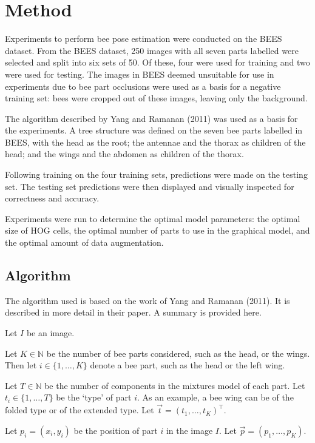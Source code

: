 \documentclass[11pt, oneside]{report}
\begin{document}
\chapter{Method}
    Experiments to perform bee pose estimation were conducted on the BEES dataset. From the BEES dataset, 250 images with all seven parts labelled were selected and split into six sets of 50. Of these, four were used for training and two were used for testing. The images in BEES deemed unsuitable for use in experiments due to bee part occlusions were used as a basis for a negative training set: bees were cropped out of these images, leaving only the background.

    The algorithm described by Yang and Ramanan (2011) was used as a basis for the experiments. A tree structure was defined on the seven bee parts labelled in BEES, with the head as the root; the antennae and the thorax as children of the head; and the wings and the abdomen as children of the thorax.

    Following training on the four training sets, predictions were made on the testing set. The testing set predictions were then displayed and visually inspected for correctness and accuracy.

    Experiments were run to determine the optimal model parameters: the optimal size of HOG cells, the optimal number of parts to use in the graphical model, and the optimal amount of data augmentation.

\section{Algorithm}
    The algorithm used is based on the work of Yang and Ramanan (2011). It is described in more detail in their paper. A summary is provided here.

    Let $I$ be an image.

    Let $K \in\mathbb{N}$ be the number of bee parts considered, such as the head, or the wings. Then let $i \in \{1,\dots,K\}$ denote a bee part, such as the head or the left wing.

    Let $T\in\mathbb{N}$ be the number of components in the mixtures model of each part.  Let $t_i \in\{1,\dots,T\}$ be the `type' of part $i$. As an example, a bee wing can be of the folded type or of the extended type. Let $\vec{t}=(t_1,\dots,t_K)^\intercal$.

    Let $p_i=(x_i,y_i)$ be the position of part $i$ in the image $I$. Let $\vec p=(p_1,\dots,p_K)$.
\end{document}
